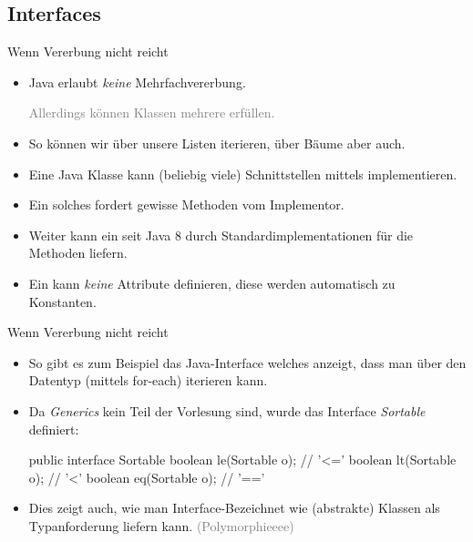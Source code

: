\subsection{Interfaces}


\begin{frame}{Wenn Vererbung nicht reicht}
    \begin{itemize}[<+(1)->]
        \widei
        \item Java erlaubt \emph{keine} Mehrfachvererbung.\pause{}\par \textcolor{gray}{Allerdings können Klassen mehrere  erfüllen.}
        \item So können wir über unsere Listen iterieren,\pause{} über Bäume aber auch.
        \item Eine Java Klasse kann (beliebig viele) Schnittstellen mittels  implementieren.
        \item Ein solches  fordert gewisse Methoden vom Implementor.
        \item Weiter kann ein  seit Java \(8\) durch  Standardimplementationen für die Methoden liefern.
        \item Ein  kann \emph{keine} Attribute definieren, diese werden automatisch zu Konstanten.
    \end{itemize}
\end{frame}

\begin{frame}[fragile]{Wenn Vererbung nicht reicht}
    \begin{itemize}[<+(1)->]
        \widei
        \item \label{mrk:int-iterable}So gibt es zum Beispiel das Java-Interface  welches anzeigt, dass man über den Datentyp (mittels for-each) iterieren kann.
        \item Da \emph{Generics} kein Teil der Vorlesung sind, wurde das Interface \emph{Sortable} definiert:\pause{}
\begin{plainjava}
public interface Sortable {
    boolean le(Sortable o); // '<='
    boolean lt(Sortable o); // '<'
    boolean eq(Sortable o); // '=='
}
\end{plainjava}
        \item Dies zeigt auch, wie man Interface-Bezeichnet wie (abstrakte) Klassen als Typanforderung liefern kann. \textcolor{gray}{(Polymorphieeee)}
    \end{itemize}
\end{frame}

